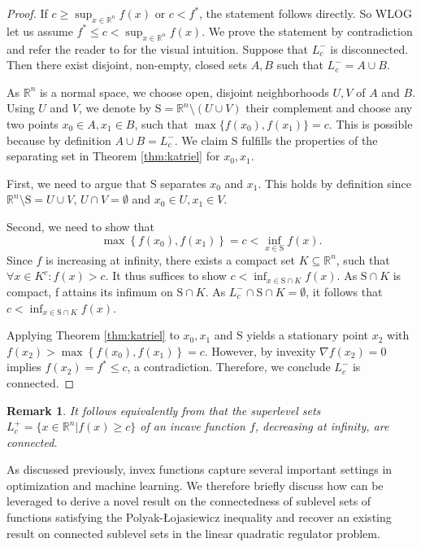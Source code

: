 \documentclass{article}
\newtheorem{rem}{Remark}
\newcommand{\R}{\mathbb{R}}
\begin{document}
\begin{proof}
    If $c\geq\sup_{x\in \R^n} f(x)$ or $c<f^*$, the statement follows directly. So WLOG let us assume $f^* \leq c<\sup_{x\in \R^n} f(x)$.
    We prove the statement by contradiction and refer the reader to  for the visual intuition. Suppose that $L^-_c$ is disconnected. Then there exist disjoint, non-empty, closed sets $A,B$ such that $L^-_c=A \cup B$.
    
    
    As $\R^n$ is a normal space, we choose open, disjoint neighborhoods $U,V$ of $A$ and $B$. 
    Using $U$ and $V$, we denote by $\mathrm{S}=\R^n\setminus(U\cup V)$ their complement and choose any two points $x_0 \in A, x_1 \in B$, such that $\max\{f(x_0),f(x_1)\}=c$. This is possible because by definition $A \cup B = L^-_c$. We claim $\mathrm{S}$ fulfills the properties of the separating set in Theorem \ref{thm:katriel} for $x_0,x_1$. 

    First, we need to argue that $\mathrm{S}$ separates $x_0$ and $x_1$. This holds by definition since $\R^n\setminus \mathrm{S}= U \cup V$, $U \cap V =\emptyset$ and $x_0\in U, x_1 \in V.$ 
    
    Second, we need to show that 
    \[\max \left\{f\left(x_0\right), f\left(x_1\right)\right\}= c<\inf _{x \in \mathrm{S}} f(x).\]
    Since $f$ is increasing at infinity, there exists a compact set $K\subseteq \R^n$, such that $\forall x \in K^c : f(x) > c$. It thus suffices to show $c<\inf _{x \in \mathrm{S}\cap K} f(x)$. As $\mathrm{S}\cap K$ is compact, f attains its infimum on $\mathrm{S}\cap K$. As $L^-_c\cap \mathrm{S} \cap K=\emptyset$, it follows that $c<\inf _{x \in \mathrm{S}\cap K} f(x)$.

      
    

    Applying Theorem \ref{thm:katriel} to $x_0,x_1$ and $\mathrm{S}$ yields a stationary point $x_2$ with $f(x_2) > \max \left\{f\left(x_0\right), f\left(x_1\right)\right\}=c$. However, by invexity $\nabla f(x_2)=0$ implies $f(x_2)=f^*\leq c$, a contradiction. Therefore, we conclude $L_c^-$ is connected.
\end{proof}



\begin{rem}
    It follows equivalently from  that the superlevel sets $L^+_c=\{x\in \R^n|f(x)\geq c\}$ of an incave function $f$, decreasing at infinity, are connected.
\end{rem}


As discussed previously, invex functions capture several important settings in optimization and machine learning. We therefore briefly discuss how  can be leveraged to derive a novel result on the connectedness of sublevel sets of functions satisfying the Polyak-\L{}ojasiewicz inequality and recover an existing result on connected sublevel sets in the linear quadratic regulator problem.
\end{document}
